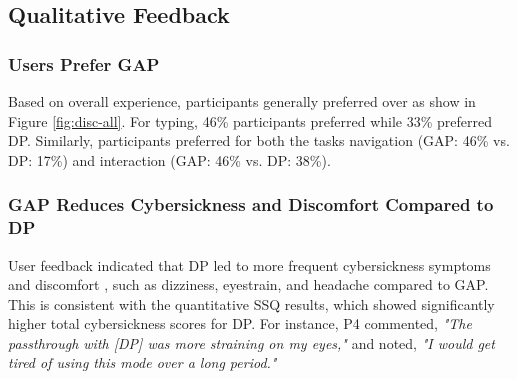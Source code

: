 \subsection{Qualitative Feedback}
\label{subsec:qualfeedback}

\subsubsection{\textbf{Users Prefer GAP}} Based on overall experience, participants generally preferred \GAP over \DP as show in Figure \ref{fig:disc-all}. For typing, 46\% participants preferred \GAP while 33\% preferred DP. Similarly, participants preferred \GAP for both the tasks navigation (GAP: 46\% vs. DP: 17\%) and interaction (GAP: 46\% vs. DP: 38\%).

\subsubsection{\textbf{GAP Reduces Cybersickness and Discomfort Compared to DP}}
User feedback indicated that DP led to more frequent cybersickness symptoms and discomfort , such as dizziness, eyestrain, and headache compared to GAP. This is consistent with the quantitative SSQ results, which showed significantly higher total cybersickness scores for DP. For instance, P4 commented, \textit{"The passthrough with [DP] was more straining on my eyes,"} and noted, \textit{"I would get tired of using this mode over a long period."}

